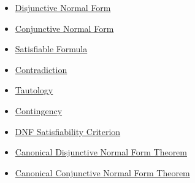 \begin{dependencies}
\begin{itemize}
  \item \hyperref[def:disjunctive-normal-form-propositional-logic]{Disjunctive Normal Form}
  \item \hyperref[def:conjunctive-normal-form-propositional-logic]{Conjunctive Normal Form}
  \item \hyperref[def:satisfiable-formula-propositional-logic]{Satisfiable Formula}
  \item \hyperref[def:contradiction-propositional-logic]{Contradiction}
  \item \hyperref[def:tautology-propositional-logic]{Tautology}
  \item \hyperref[def:contingency-propositional-logic]{Contingency}
  \item \hyperref[thm:dnf-satisfiability-criterion-propositional-logic]{DNF Satisfiability Criterion}
  \item \hyperref[thm:canonical-disjunctive-normal-form-propositional-logic]{Canonical Disjunctive Normal Form Theorem}
  \item \hyperref[thm:canonical-conjunctive-normal-form-propositional-logic]{Canonical Conjunctive Normal Form Theorem}
\end{itemize}
\end{dependencies}

\clearpage
